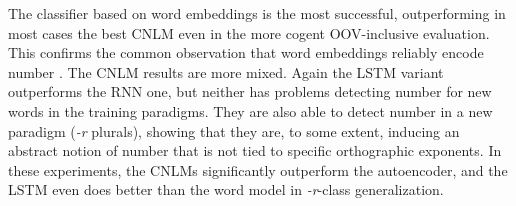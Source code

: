 

The classifier based on word embeddings is the most successful,
outperforming in most cases the best CNLM even in the more cogent
OOV-inclusive evaluation. This confirms the common observation that
word embeddings reliably encode number \cite{Mikolov:etal:2013a}. The
CNLM results are more mixed. Again the LSTM variant outperforms the
RNN one, but neither has problems detecting number for new words in
the training paradigms. They are also able to detect number in a new
paradigm (\emph{-r} plurals), showing that they are, to some extent,
inducing an abstract notion of number that is not tied to specific
orthographic exponents. In these experiments, the CNLMs significantly
outperform the autoencoder, and the LSTM even does better than the
word model in \emph{-r}-class generalization.

